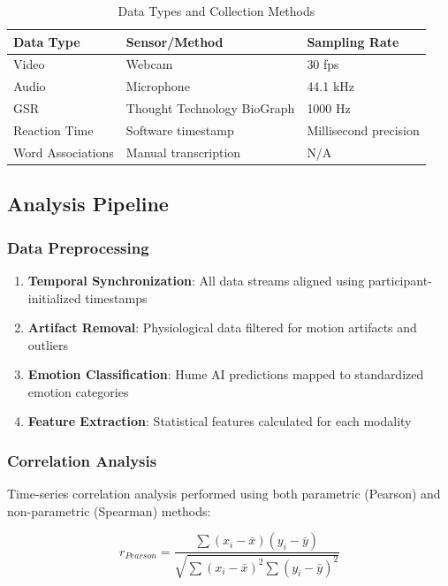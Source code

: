 \documentclass[12pt,a4paper]{article}
\begin{document}
\begin{table}[H]
\centering
\caption{Data Types and Collection Methods}
\label{tab:data_types}
\begin{tabular}{@{}lll@{}}
\toprule
Data Type & Sensor/Method & Sampling Rate \\
\midrule
Video & Webcam & 30 fps \\
Audio & Microphone & 44.1 kHz \\
GSR & Thought Technology BioGraph & 1000 Hz \\
Reaction Time & Software timestamp & Millisecond precision \\
Word Associations & Manual transcription & N/A \\
\bottomrule
\end{tabular}
\end{table}

\subsection{Analysis Pipeline}

\subsubsection{Data Preprocessing}

\begin{enumerate}
    \item \textbf{Temporal Synchronization}: All data streams aligned using participant-initialized timestamps
    \item \textbf{Artifact Removal}: Physiological data filtered for motion artifacts and outliers
    \item \textbf{Emotion Classification}: Hume AI predictions mapped to standardized emotion categories
    \item \textbf{Feature Extraction}: Statistical features calculated for each modality
\end{enumerate}

\subsubsection{Correlation Analysis}

Time-series correlation analysis performed using both parametric (Pearson) and non-parametric (Spearman) methods:

\begin{equation}
r_{Pearson} = \frac{\sum (x_i - \bar{x})(y_i - \bar{y})}{\sqrt{\sum (x_i - \bar{x})^2 \sum (y_i - \bar{y})^2}}
\end{equation}
\end{document}
